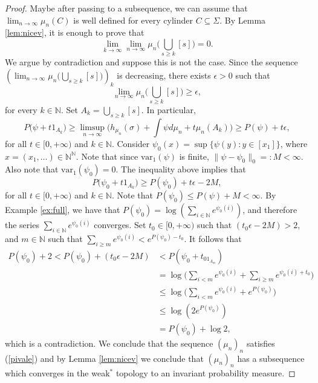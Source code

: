 \documentclass[letterpaper,11pt]{amsart}
\theoremstyle{plain}
\theoremstyle{plain}
\theoremstyle{definition}
\theoremstyle{remark}
\def\e{\epsilon}
\def\N{{\mathbb N}}
\begin{document}
\begin{proof} Maybe after passing to a subsequence, we can assume that $\lim_{n\to\infty}\mu_n(C)$ is well defined for every cylinder $C\subseteq\Sigma$. By Lemma \ref{lem:nicev}, it is enough to prove that $$\lim_{k\to\infty}\lim_{n\to\infty}\mu_n\big(\bigcup_{s\ge k}[s]\big)=0.$$
We argue by contradiction and suppose this is not the case.  Since the sequence \\$(\lim_{n\to\infty}\mu_n\big(\bigcup_{s\ge k}[s]\big))_k$ is decreasing, there exists $\e>0$ such that $$\lim_{n\to\infty}\mu_n\big(\bigcup_{s\ge k}[s]\big)\ge \e,$$ for every $k\in \N$. Set $A_k=\bigcup_{s\ge k}[s]$. In particular,
$$P\big(\psi+t1_{A_k}\big)\ge \limsup_{n\to\infty} \big(h_{\mu_n}(\sigma)+\int \psi d\mu_n+t\mu_n(A_k)\big)\ge P(\psi)+t\e,$$
for all $t\in [0,+\infty)$ and $k\in\N$. Consider $\psi_0(x)=\sup\{\psi(y):y\in [x_1]\}$, where $x=(x_1,\ldots)\in\N^\N$. Note that  since  $\text{var}_1(\psi)$ is finite, $\|\psi-\psi_0\|_0=: M<\infty$. Also note that $\text{var}_1(\psi_0)=0$. The inequality above implies that 
$$P\big(\psi_0+t1_{A_k}\big)\ge P(\psi_0)+t\e-2M,$$
for all $t\in [0,+\infty)$ and $k\in\N$. Note that $P(\psi_0)\le P(\psi)+M<\infty$. By Example \ref{ex:full}, we have that $P(\psi_0)=\log(\sum_{i\in\N}e^{\psi_0(i)})$, and therefore the series $\sum_{i\in\N}e^{\psi_0(i)}$ converges. Set $t_0\in [0,+\infty)$ such that $(t_0\e-2M)>2$, and $m\in \N$ such that $\sum_{i\ge m}e^{\psi_0(i)}<e^{P(\psi_0)-t_0}$. It follows that 
\begin{align*} 
P(\psi_0)+2< P(\psi_0)+(t_0\e-2M)&<P(\psi_0+t_01_{A_m})\\
&=\log\big(\sum_{i<m}e^{\psi_0(i)}+\sum_{i\ge m}e^{\psi_0(i)+t_0}\big)\\
&\le \log\big(\sum_{i<m}e^{\psi_0(i)}+e^{P(\psi_0)}\big)\\
&\le \log(2e^{P(\psi_0)})\\
&=P(\psi_0)+\log2,
\end{align*}
which is a contradiction. We conclude that the sequence $(\mu_n)_n$ satisfies (\ref{pivale}) and by Lemma \ref{lem:nicev} we conclude that $(\mu_n)_n$ has a subsequence which converges in the weak$^*$ topology to an invariant probability measure. 
\end{proof}
\end{document}
